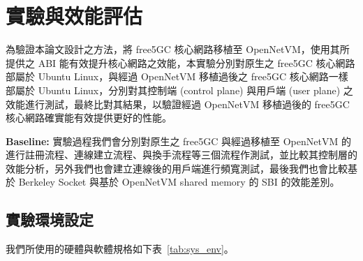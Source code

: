 \chapter{實驗與效能評估}
\label{chapter:evaluation}



為驗證本論文設計之方法，將 free5GC 核心網路移植至 OpenNetVM，使用其所提供之 ABI 能有效提升核心網路之效能，本實驗分別對原生之 free5GC 核心網路部屬於 Ubuntu Linux，與經過 OpenNetVM 移植過後之 free5GC 核心網路一樣部屬於 Ubuntu Linux，分別對其控制端 (control plane) 與用戶端 (user plane) 之效能進行測試，最終比對其結果，以驗證經過 OpenNetVM 移植過後的 free5GC 核心網路確實能有效提供更好的性能。

\textbf{Baseline:} 實驗過程我們會分別對原生之 free5GC 與經過移植至 OpenNetVM 的 \LHCN 進行註冊流程、連線建立流程、與換手流程等三個流程作測試，並比較其控制層的效能分析，另外我們也會建立連線後的用戶端進行頻寬測試，最後我們也會比較基於 Berkeley Socket 與基於 OpenNetVM shared memory 的 SBI 的效能差別。

\section{實驗環境設定}
\label{sec:evaluation_env}

我們所使用的硬體與軟體規格如下表~\ref{tab:sys_env}。

